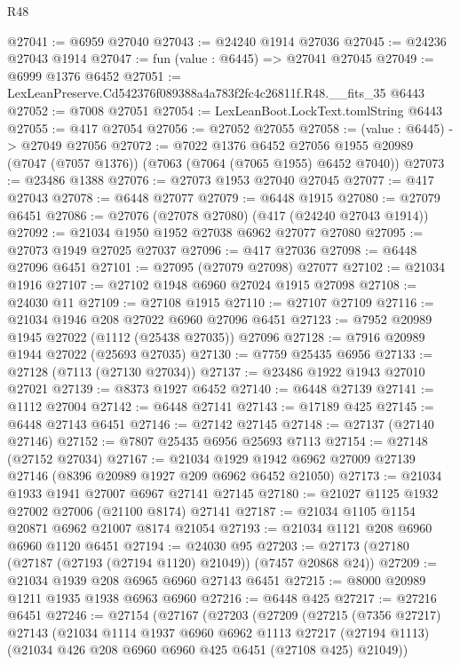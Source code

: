 \begin{lexlean}{R48}
\begin{coremodule}
@27041 := @6959 @27040
@27043 := @24240 @1914 @27036
@27045 := @24236 @27043 @1914
@27047 := fun (value : @6445) => @27041 @27045
@27049 := @6999 @1376 @6452
@27051 := LexLeanPreserve.Cd542376f089388a4a783f2fc4c26811f.R48.__fits_35 @6443
@27052 := @7008 @27051
@27054 := LexLeanBoot.LockText.tomlString @6443
@27055 := @417 @27054
@27056 := @27052 @27055
@27058 := (value : @6445) -> @27049 @27056
@27072 := @7022
    @1376
    @6452
    @27056
    @1955
    @20989
    (@7047 (@7057 @1376))
    (@7063 (@7064 (@7065 @1955) @6452 @7040))
@27073 := @23486 @1388
@27076 := @27073 @1953 @27040 @27045
@27077 := @417 @27043
@27078 := @6448 @27077
@27079 := @6448 @1915
@27080 := @27079 @6451
@27086 := @27076 (@27078 @27080) (@417 (@24240 @27043 @1914))
@27092 := @21034 @1950 @1952 @27038 @6962 @27077 @27080
@27095 := @27073 @1949 @27025 @27037
@27096 := @417 @27036
@27098 := @6448 @27096 @6451
@27101 := @27095 (@27079 @27098) @27077
@27102 := @21034 @1916
@27107 := @27102 @1948 @6960 @27024 @1915 @27098
@27108 := @24030 @11
@27109 := @27108 @1915
@27110 := @27107 @27109
@27116 := @21034 @1946 @208 @27022 @6960 @27096 @6451
@27123 := @7952 @20989 @1945 @27022 (@1112 (@25438 @27035)) @27096
@27128 := @7916 @20989 @1944 @27022 (@25693 @27035)
@27130 := @7759 @25435 @6956
@27133 := @27128 (@7113 (@27130 @27034))
@27137 := @23486 @1922 @1943 @27010 @27021
@27139 := @8373 @1927 @6452
@27140 := @6448 @27139
@27141 := @1112 @27004
@27142 := @6448 @27141
@27143 := @17189 @425
@27145 := @6448 @27143 @6451
@27146 := @27142 @27145
@27148 := @27137 (@27140 @27146)
@27152 := @7807 @25435 @6956 @25693 @7113
@27154 := @27148 (@27152 @27034)
@27167 := @21034 @1929 @1942 @6962 @27009 @27139 @27146 (@8396 @20989 @1927 @209 @6962 @6452 @21050)
@27173 := @21034 @1933 @1941 @27007 @6967 @27141 @27145
@27180 := @21027 @1125 @1932 @27002 @27006 (@21100 @8174) @27141
@27187 := @21034 @1105 @1154 @20871 @6962 @21007 @8174 @21054
@27193 := @21034 @1121 @208 @6960 @6960 @1120 @6451
@27194 := @24030 @95
@27203 := @27173 (@27180 (@27187 (@27193 (@27194 @1120) @21049)) (@7457 @20868 @24))
@27209 := @21034 @1939 @208 @6965 @6960 @27143 @6451
@27215 := @8000 @20989 @1211 @1935 @1938 @6963 @6960
@27216 := @6448 @425
@27217 := @27216 @6451
@27246 := @27154
    (@27167
      (@27203
        (@27209
          (@27215
            (@7356 @27217)
            @27143
            (@21034
              @1114
              @1937
              @6960
              @6962
              @1113
              @27217
              (@27194 @1113)
              (@21034 @426 @208 @6960 @6960 @425 @6451 (@27108 @425) @21049))

\end{coremodule}
\end{lexlean}
